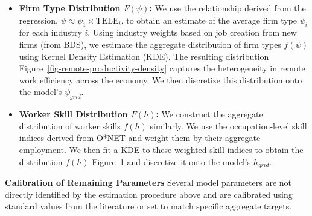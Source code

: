 \documentclass[
  11pt,
  letterpaper,
  DIV=11,
  numbers=noendperiod]{scrartcl}
\providecommand{\tightlist}{%
  \setlength{\itemsep}{0pt}\setlength{\parskip}{0pt}}\usepackage{longtable,booktabs,array}
\theoremstyle{plain}
\theoremstyle{remark}
\begin{document}
\begin{itemize}
\tightlist
\item
  \textbf{Firm Type Distribution \(F(\psi)\):} We use the relationship
  derived from the regression,
  \(\psi \approx \psi_1 \times \text{TELE}_{i}\), to obtain an estimate
  of the average firm type \(\psi_i\) for each industry \(i\). Using
  industry weights based on job creation from new firms (from BDS), we
  estimate the aggregate distribution of firm types \(f(\psi)\) using
  Kernel Density Estimation (KDE). The resulting distribution
  Figure~\ref{fig-remote-productivity-density} captures the
  heterogeneity in remote work efficiency across the economy. We then
  discretize this distribution onto the model's \(\psi_{grid}\).
\end{itemize}

\begin{figure}


\caption{\label{fig-skill-density}}

\end{figure}%

\begin{itemize}
\tightlist
\item
  \textbf{Worker Skill Distribution \(F(h)\):} We construct the
  aggregate distribution of worker skills \(f(h)\) similarly. We use the
  occupation-level skill indices derived from O*NET and weight them by
  their aggregate employment. We then fit a KDE to these weighted skill
  indices to obtain the distribution \(f(h)\)
  Figure~\ref{fig-skill-density} and discretize it onto the model's
  \(h_{grid}\).
\end{itemize}

\textbf{Calibration of Remaining Parameters} Several model parameters
are not directly identified by the estimation procedure above and are
calibrated using standard values from the literature or set to match
specific aggregate targets.
\end{document}

